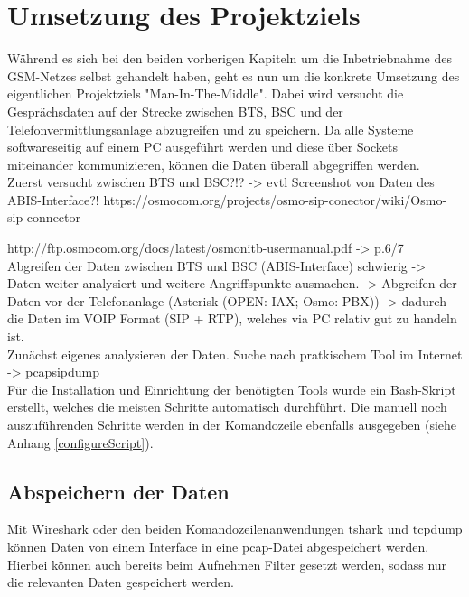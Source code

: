 \section{Umsetzung des Projektziels}\label{umsetzungProjekt}
Während es sich bei den beiden vorherigen Kapiteln um die Inbetriebnahme des GSM-Netzes selbst gehandelt haben, geht es nun um die konkrete Umsetzung des eigentlichen Projektziels "Man-In-The-Middle". Dabei wird versucht die Gesprächsdaten auf der Strecke zwischen BTS, BSC und der Telefonvermittlungsanlage abzugreifen und zu speichern. Da alle Systeme softwareseitig auf einem PC ausgeführt werden und diese über Sockets miteinander kommunizieren, können die Daten überall abgegriffen werden.\\

Zuerst versucht zwischen BTS und BSC?!?
-> evtl Screenshot von Daten des ABIS-Interface?!
https://osmocom.org/projects/osmo-sip-conector/wiki/Osmo-sip-connector

http://ftp.osmocom.org/docs/latest/osmonitb-usermanual.pdf -> p.6/7 \\

Abgreifen der Daten zwischen BTS und BSC (ABIS-Interface) schwierig -> Daten weiter analysiert und weitere Angriffspunkte ausmachen.
-> Abgreifen der Daten vor der Telefonanlage (Asterisk (OPEN: IAX; Osmo: PBX)) -> dadurch die Daten im VOIP Format (SIP + RTP), welches via PC relativ gut zu handeln ist. \\

Zunächst eigenes analysieren der Daten. Suche nach pratkischem Tool im Internet
-> pcapsipdump\\


Für die Installation und Einrichtung der benötigten Tools wurde ein Bash-Skript erstellt, welches die meisten Schritte automatisch durchführt. Die manuell noch auszuführenden Schritte werden in der Komandozeile ebenfalls ausgegeben (siehe Anhang \ref{configureScript}).


\subsection{Abspeichern der Daten}\label{abspeichern}
Mit Wireshark oder den beiden Komandozeilenanwendungen tshark und tcpdump können Daten von einem Interface in eine pcap-Datei abgespeichert werden. Hierbei können auch bereits beim Aufnehmen Filter gesetzt werden, sodass nur die relevanten Daten gespeichert werden.\\

